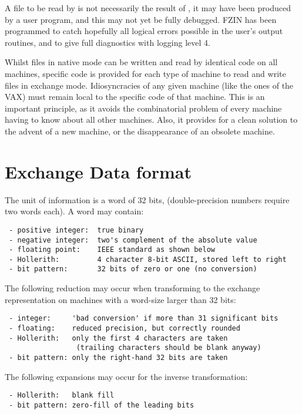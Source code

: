 A file to be read by  is not necessarily the result of ,
it may have been produced by a user program,
and this may not yet be fully debugged.
FZIN has been programmed to catch hopefully all logical errors
possible in the user's output routines,
and to give full diagnostics with logging level 4.

Whilst files in native mode can be written and read by identical
code on all machines,
specific code is provided for each type of machine
to read and write files in exchange mode.
Idiosyncracies of any given machine (like the ones of the VAX)
must remain local to the specific code of that machine.
This is an important principle,
as it avoids the combinatorial problem of every machine
having to know about all other machines.
Also,
it provides for a clean solution to the advent of a new machine,
or the disappearance of an obsolete machine.

\section{Exchange Data format}

The unit of information is a word of 32 bits,
(double-precision numbers require two words each).
A word may contain:

\begin{verbatim}
 - positive integer:  true binary
 - negative integer:  two's complement of the absolute value
 - floating point:    IEEE standard as shown below
 - Hollerith:         4 character 8-bit ASCII, stored left to right
 - bit pattern:       32 bits of zero or one (no conversion)
\end{verbatim}

The following reduction may occur when transforming
to the exchange representation on machines with a word-size
larger than 32 bits:

\begin{verbatim}
 - integer:     'bad conversion' if more than 31 significant bits
 - floating:    reduced precision, but correctly rounded
 - Hollerith:   only the first 4 characters are taken
                 (trailing characters should be blank anyway)
 - bit pattern: only the right-hand 32 bits are taken
\end{verbatim}

The following expansions may occur for the inverse transformation:

\begin{verbatim}
 - Hollerith:   blank fill
 - bit pattern: zero-fill of the leading bits
\end{verbatim}

